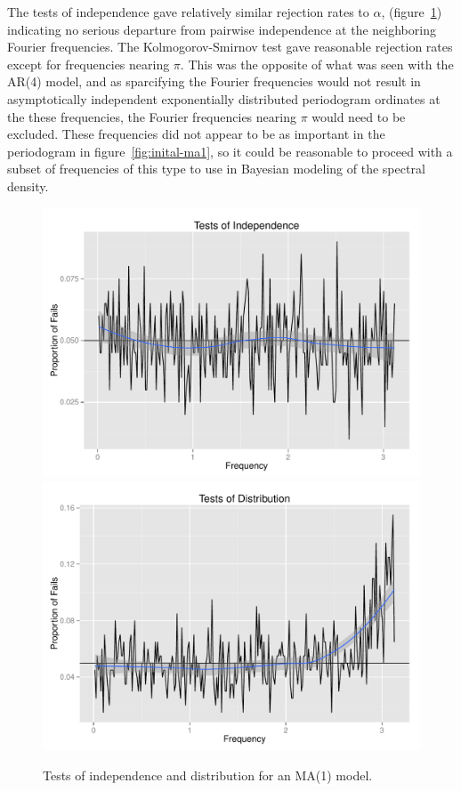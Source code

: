 \documentclass{article}\usepackage[]{graphicx}\usepackage[]{color}
\newenvironment{knitrout}{}{} %
\theoremstyle{plain}
\begin{document}
The tests of independence gave relatively similar rejection rates to $\alpha$, (figure~\ref{fig:tests-ma1}) indicating no serious departure from pairwise independence at the neighboring Fourier frequencies. The Kolmogorov-Smirnov test gave reasonable rejection rates except for frequencies nearing $\pi$. This was the opposite of what was seen with the AR(4) model, and as sparcifying the Fourier frequencies would not result in asymptotically independent exponentially distributed periodogram ordinates at the these frequencies, the Fourier frequencies nearing $\pi$ would need to be excluded. These frequencies did not appear to be as important in the periodogram in figure~\ref{fig:inital-ma1}, so it could be reasonable to proceed with a subset of frequencies of this type to use in Bayesian modeling of the spectral density. 

\begin{knitrout}
\color{fgcolor}\begin{figure}[h]

\includegraphics[width=.49\textwidth]{figure/tests-ma11} 
\includegraphics[width=.49\textwidth]{figure/tests-ma12} \caption[Tests of independence and distribution for an MA(1) model]{Tests of independence and distribution for an MA(1) model.\label{fig:tests-ma1}}
\end{figure}


\end{knitrout}


% 
% 
\end{document}
